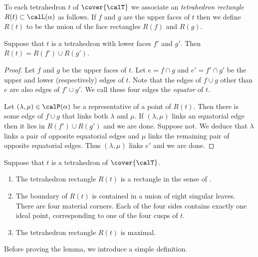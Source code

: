 \documentclass[12pt]{amsart}
\begin{document}
\begin{definition}
\label{Def:TetRectangle}
To each tetrahedron $t$ of $\cover{\calT}$ we associate an \emph{tetrahedron rectangle} $R(t) \subset \calL(\alpha)$ as follows.  If $f$ and $g$ are the upper faces of $t$ then we define $R(t)$ to be the union of the face rectangles $R(f)$ and $R(g)$.  
\end{definition}

\begin{lemma}
\label{Lem:TetRectangleLower}
Suppose that $t$ is a tetrahedron with lower faces $f'$ and $g'$.  Then $R(t) = R(f') \cup R(g')$.
\end{lemma}

\begin{proof}
Let $f$ and $g$ be the upper faces of $t$.  Let $e = f \cap g$ and $e' = f' \cap g'$ be the upper and lower (respectively) edges of $t$.  Note that the edges of $f \cup g$ other than $e$ are also edges of $f' \cup g'$.  We call these four edges the \emph{equator} of $t$. 

Let $(\lambda,\mu) \in \calP(\alpha)$ be a representative of a point of $R(t)$.  Then there is some edge of $f\cup g$ that links both $\lambda$ and $\mu$. If $(\lambda,\mu)$ links an equatorial edge then it lies in $R(f') \cup R(g')$ and we are done.  Suppose not.  We deduce that $\lambda$ links a pair of opposite equatorial edges and $\mu$ links the remaining pair of opposite equatorial edges.  Thus $(\lambda,\mu)$ links $e'$ and we are done.
\end{proof}

\begin{lemma}
\label{Lem:TetRectangle}
Suppose that $t$ is a tetrahedron of $\cover{\calT}$.
\begin{enumerate}
\item
\label{Itm:TetRectRect}
The tetrahedron rectangle $R(t)$ is a rectangle in the sense of .
\item
\label{Itm:TetRectBdy}
The boundary of $R(t)$ is contained in a union of eight singular leaves.  There are four material corners. Each of the four sides contains exactly one ideal point, corresponding to one of the four cusps of $t$.
\item
\label{Itm:TetRectMax}
The tetrahedron rectangle $R(t)$ is maximal.
\end{enumerate}
\end{lemma}

Before proving the lemma, we introduce a simple definition.
\end{document}
